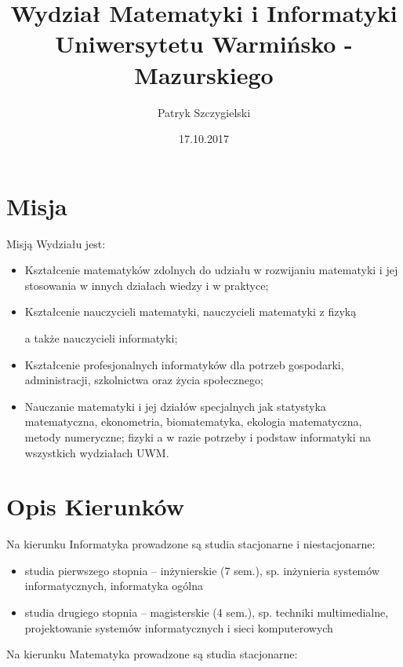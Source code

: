 \documentclass[a4paper,12pt]{article}
\title{Wydział Matematyki i Informatyki Uniwersytetu
Warmińsko - Mazurskiego
}
\author{Patryk Szczygielski}
\date{17.10.2017}
\begin{document}
\maketitle

\begin{abstract}

\end{abstract}

\tableofcontents
{}
\section{Misja}
Misją Wydziału jest:
\begin{itemize}
	\item Kształcenie matematyków zdolnych do udziału w rozwijaniu matematyki i jej stosowania w innych
działach wiedzy i w praktyce;


	\item Kształcenie nauczycieli matematyki, nauczycieli matematyki z fizyką 
	
	a także nauczycieli informatyki;

	\item Kształcenie profesjonalnych informatyków dla potrzeb gospodarki, administracji, szkolnictwa oraz życia
społecznego;


	\item Nauczanie matematyki i jej działów specjalnych jak statystyka matematyczna, ekonometria,
biomatematyka, ekologia matematyczna, metody numeryczne; fizyki a w razie potrzeby i podstaw
informatyki na wszystkich wydziałach UWM.

\end {itemize}
\section{Opis Kierunków}
Na kierunku Informatyka prowadzone są studia stacjonarne i niestacjonarne:
\begin {itemize}
	\item studia pierwszego stopnia – inżynierskie (7 sem.), sp. inżynieria systemów informatycznych, informatyka ogólna

\item studia drugiego stopnia – magisterskie (4 sem.), sp. techniki multimedialne, projektowanie systemów
informatycznych i sieci komputerowych
\end {itemize}

Na kierunku Matematyka prowadzone są studia stacjonarne:
\end{document}
